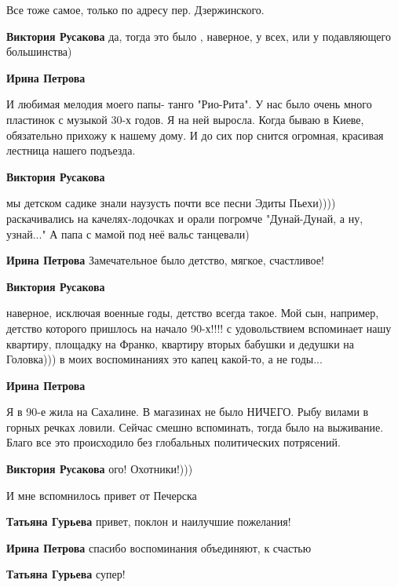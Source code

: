 \begin{itemize}
Все тоже самое, только по адресу пер. Дзержинского.

\begin{itemize} %
\textbf{Виктория Русакова} да, тогда это было , наверное, у всех, или у подавляющего большинства)

\textbf{Ирина Петрова} 

И любимая мелодия моего папы- танго "Рио-Рита". У нас было очень много
пластинок с музыкой 30-х годов. Я на ней выросла. Когда бываю в Киеве,
обязательно прихожу к нашему дому. И до сих пор снится огромная, красивая
лестница нашего подъезда.

\textbf{Виктория Русакова} 

мы детском садике знали наузусть почти все песни Эдиты Пьехи)))) раскачивались
на качелях-лодочках и орали погромче "Дунай-Дунай, а ну, узнай..." А папа с
мамой под неё вальс танцевали)

\textbf{Ирина Петрова} Замечательное было детство, мягкое, счастливое!

\textbf{Виктория Русакова} 

наверное, исключая военные годы, детство всегда такое. Мой сын, например,
детство которого пришлось на начало 90-х!!!! с удовольствием вспоминает нашу
квартиру, площадку на Франко, квартиру вторых бабушки и дедушки на Головка))) в
моих воспоминаниях это капец какой-то, а не годы...

\textbf{Ирина Петрова} 

Я в 90-е жила на Сахалине. В магазинах не было НИЧЕГО. Рыбу вилами в горных
речках ловили. Сейчас смешно вспоминать, тогда было на выживание. Благо все это
происходило без глобальных политических потрясений.

\textbf{Виктория Русакова} ого! Охотники!)))

\end{itemize} %

И мне вспомнилось привет от Печерска

\begin{itemize} %
\textbf{Татьяна Гурьева} привет, поклон и наилучшие пожелания!

\textbf{Ирина Петрова} спасибо воспоминания объединяют, к счастью

\textbf{Татьяна Гурьева} супер!


\end{itemize}
\end{itemize}
